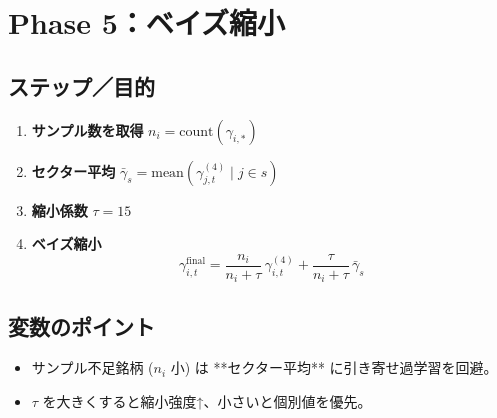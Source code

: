 
\section*{Phase 5：ベイズ縮小}\nopagebreak[4]
\subsection*{ステップ／目的}
\begin{flushleft}
\begin{enumerate}
  \item \textbf{サンプル数を取得}\;
        \(n_i=\text{count}(\gamma_{i,\ast})\)
  \item \textbf{セクター平均}\;
        \(\bar\gamma_s = \text{mean}(\gamma_{j,t}^{(4)}\mid j\in s)\)
  \item \textbf{縮小係数}\;
        \(\tau=15\)
  \item \textbf{ベイズ縮小}\;
        \[
          \gamma_{i,t}^{\text{final}}
            =\frac{n_i}{n_i+\tau}\,\gamma_{i,t}^{(4)}
            +\frac{\tau}{n_i+\tau}\,\bar\gamma_s
        \]
\end{enumerate}
\end{flushleft}

\subsection*{変数のポイント}
\begin{flushleft}
\begin{itemize}
  \item サンプル不足銘柄 (\(n_i\) 小) は **セクター平均** に引き寄せ過学習を回避。  
  \item \(\tau\) を大きくすると縮小強度↑、小さいと個別値を優先。
\end{itemize}
\end{flushleft}

